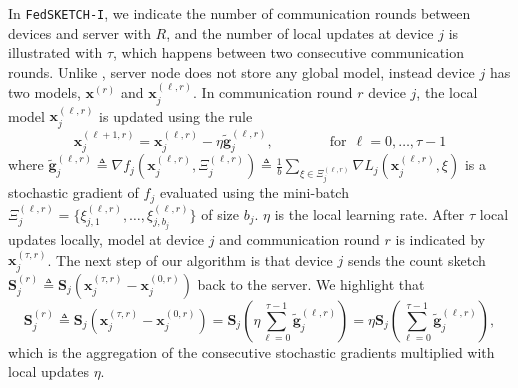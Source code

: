 In \texttt{FedSKETCH-I}, we indicate the number of communication rounds between devices and server with $R$, and the number of local updates at device $j$ is illustrated with $\tau$, which happens between two consecutive communication rounds. Unlike \cite{haddadpour2020federated}, server node does not store any global model, instead device $j$ has two models, $\boldsymbol{x}^{(r)}$ and $\boldsymbol{x}^{(\ell,r)}_j$. In communication round $r$ device $j$, the local model $\boldsymbol{x}^{(\ell,r)}_j$ is updated using the rule $$\boldsymbol{x}_j^{(\ell+1,r)}=\boldsymbol{x}_j^{(\ell,r)}-\eta \tilde{\mathbf{g}}_j^{(\ell,r)}, \qquad\qquad \text{for}\:\:\ell=0,\ldots,\tau-1$$
where $\tilde{\mathbf{g}}_j^{(\ell,r)}\triangleq\nabla{f}_j(\boldsymbol{x}_j^{(\ell,r)},\Xi_j^{(\ell,r)})\triangleq\frac{1}{b}\sum_{\xi\in\Xi_j^{(\ell,r)}}\nabla{L}_j(\boldsymbol{x}_j^{(\ell,r)},\xi)$ is a stochastic gradient of $f_j$ evaluated using the mini-batch $\Xi_j^{(\ell,r)}=\{\xi^{(\ell,r)}_{j,1},\ldots,\xi^{(\ell,r)}_{j,b_j} \}$ of size $b_j$. $\eta$ is the local learning rate. After $\tau$ local updates locally, model at device $j$ and communication round $r$ is indicated by $\boldsymbol{x}_j^{(\tau,r)}$. The next step of our algorithm is that device $j$ sends the count sketch $\mathbf{S}_j^{(r)}\triangleq\mathbf{S}_j\left(\boldsymbol{x}_j^{(\tau,r)}-\boldsymbol{x}_j^{(0,r)}\right)$ back to the server. We highlight that $$\mathbf{S}_j^{(r)}\triangleq\mathbf{S}_j\left(\boldsymbol{x}_j^{(\tau,r)}-\boldsymbol{x}_j^{(0,r)}\right)=\mathbf{S}_j\left(\eta\sum_{\ell=0}^{\tau-1}\tilde{\mathbf{g}}_j^{(\ell,r)}\right)=\eta\mathbf{S}_j\left(\sum_{\ell=0}^{\tau-1}\tilde{\mathbf{g}}_j^{(\ell,r)}\right),$$ which is the aggregation of the consecutive stochastic gradients multiplied with local updates $\eta$.

